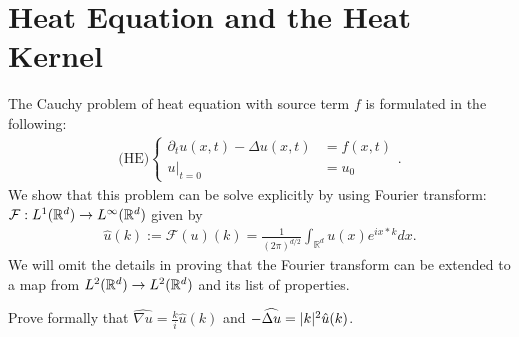 \section{Heat Equation and the Heat Kernel}
The Cauchy problem of heat equation with source term $f$  is formulated in the following:
  \begin{align}\label{HE}
   \text{(HE)}\begin{cases}
   \partial_t u(x,t) - \Delta u(x,t) &=f(x,t)\\
   u \rvert_{t=0} &= u_0
 \end{cases} 
 .\end{align}
We show that this problem can be solve explicitly by using Fourier transform:
$\mathcal{F} : L^1(\mathbb{R}^d) \to  L^\infty(\mathbb{R}^d) $ given by
\begin{align*}
  \hat{u} (k):=\mathcal{F}(u)(k) =\frac{1}{(2\pi)^{d/2}} \int_{\mathbb{R}^{d} } u(x) e^{ix*k}  dx 
.\end{align*}
We will omit the details in proving that the Fourier transform can be extended to a map from $ L^2(\mathbb{R}^d) \to  L^2(\mathbb{R}^d) $ and its list of properties.
\begin{exercise}
  Prove formally that $\widehat{\nabla u} = \frac{k}{i} \hat{u}(k)$ and $  - \widehat{\Delta u}  = \lvert k\rvert^2 \hat{u}(k)$.
\end{exercise}

